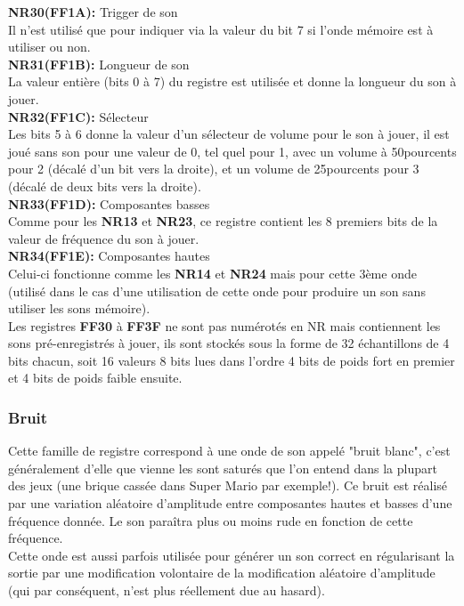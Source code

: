 \documentclass[french]{report}
\begin{document}
	\textbf{NR30(FF1A):} Trigger de son \\ 
		Il n'est utilisé que pour indiquer via la
		valeur du bit 7 si l'onde mémoire est à utiliser ou
		non.\\
		
	\textbf{NR31(FF1B):} Longueur de son \\
		La valeur entière (bits 0 à 7) du
		registre est utilisée et donne la longueur du son à
		jouer.\\ 
		
	\textbf{NR32(FF1C):} Sélecteur \\
		Les bits 5 à 6 donne la valeur d'un
		sélecteur de volume pour le son à jouer, il est joué
		sans son pour une valeur de 0, tel quel pour 1, avec un volume à 50pourcents 
		pour 2 (décalé d'un bit vers la droite), et un volume
		de 25pourcents pour 3 (décalé de deux bits vers la droite). \\
		
	\textbf{NR33(FF1D):} Composantes basses \\
		Comme pour les \textbf{NR13} et \textbf{NR23}, ce registre
		contient les 8 premiers bits de la valeur de fréquence
		du son à jouer.\\

	\textbf{NR34(FF1E):} Composantes hautes \\
		Celui-ci fonctionne comme les \textbf{NR14} et \textbf{NR24} mais pour
		cette 3ème onde (utilisé dans le cas d'une utilisation
		de cette onde pour produire un son sans utiliser les
		sons mémoire). \\

	Les registres \textbf{FF30} à \textbf{FF3F} ne sont pas numérotés en NR
		mais contiennent les sons pré-enregistrés à jouer, ils
		sont stockés sous la forme de 32 échantillons de 4
		bits chacun, soit 16 valeurs 8 bits lues dans l'ordre
		4 bits de poids fort en premier et 4 bits de poids
		faible ensuite.

	\subsubsection{Bruit}
		Cette famille de registre correspond à une onde de son
		appelé "bruit blanc", c'est généralement d'elle que
		vienne les sont saturés que l'on entend dans la
		plupart des jeux (une brique cassée dans Super Mario
		par exemple!). 
		Ce bruit est réalisé par une variation aléatoire
		d'amplitude entre composantes hautes et basses d'une
		fréquence donnée. Le son paraîtra plus ou moins rude
		en fonction de cette fréquence. \\
		Cette onde est aussi parfois utilisée pour générer un
		son correct en régularisant la sortie par une
		modification volontaire de la modification aléatoire
		d'amplitude (qui par conséquent, n'est plus réellement
		due au hasard). \\
\end{document}
